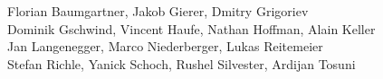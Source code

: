 %
%
%
Florian Baumgartner,	%
Jakob Gierer,		%
Dmitry Grigoriev%
\\
Dominik Gschwind,	%
Vincent Haufe,		%
Nathan Hoffman,		%
Alain Keller%
\\
Jan Langenegger,	%
Marco Niederberger,	%
Lukas Reitemeier%
\\
Stefan Richle,		%
Yanick Schoch,		%
Rushel Silvester,
Ardijan Tosuni%
